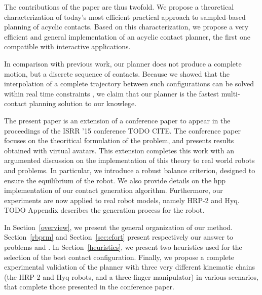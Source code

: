 The contributions of the paper are thus twofold. We propose a theoretical characterization of today's most efficient practical approach to sampled-based planning of acyclic contacts. Based on this characterization, we propose a very efficient and general implementation of an acyclic contact planner, the first one compatible with interactive applications.

In comparison with previous work, our planner does not produce a complete motion, but a discrete sequence of contacts.
Because we showed that the interpolation of a complete trajectory between such configurations can be solved within real time constraints \citep{Carpentier2016}, we claim that our planner
is the fastest multi-contact planning solution to our knowlege.

The present paper is an extension of a conference paper to appear in the proceedings of the ISRR '15 conference TODO CITE.
The conference paper focuses on the theoritical formulation of the problem, and presents results obtained with virtual avatars.
This extension completes this work with an argumented discussion on the implementation of this theory to real world robots and problems.
In particular, we introduce a robust balance criterion, designed to ensure the equilibrium of the robot. We also provide details on the hpp implementation
of our contact generation algorithm. Furthermore, our experiments are now applied to real robot models, namely HRP-2 and Hyq. TODO Appendix describes the generation process
for the robot.

In Section~\ref{overview}, we present the general organization of our method. Section~\ref{rbprm} and Section~\ref{sec:efort} present respectively our answer to problems \Pa and \Pb. In Section~\ref{heuristics}, we present two heuristics used for the selection of the best contact configuration. Finally, we propose a complete experimental validation of the planner with three very different kinematic chains (the HRP-2 and Hyq robots, and a three-finger manipulator) in various scenarios,
that complete those presented in the conference paper.
